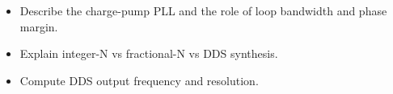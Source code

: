 \begin{objectives}
\begin{itemize}[leftmargin=1.4em,itemsep=2pt]
\item Describe the charge-pump PLL and the role of loop bandwidth and phase margin.
\item Explain integer-N vs fractional-N vs DDS synthesis.
\item Compute DDS output frequency and resolution.
\end{itemize}
\end{objectives}
